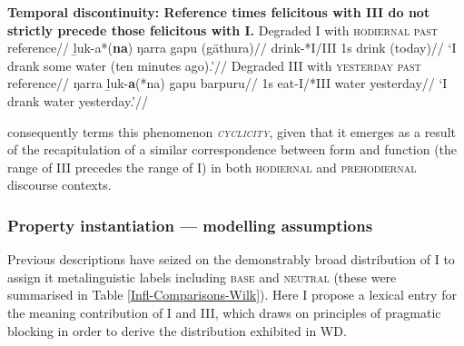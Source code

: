 \pex\textbf{ Temporal discontinuity: Reference times felicitous with \gls{III} do not strictly precede those felicitous with \gls{I}.}
\a\begingl\glpreamble Degraded \gls{I} with \textsc{hodiernal past} reference//
\gla ḻuk-a*(\textbf{na}) ŋarra gapu (gäthura)//
\glb drink-*\gls{I}/\gls{III} 1s drink (today)//
\glft`I drank some water (ten minutes ago).'//\endgl
\a\begingl\glpreamble Degraded \gls{III} with \textsc{yesterday past} reference//
\gla ŋarra ḻuk-\textbf{a}(*na) gapu barpuru//
\glb 1s eat-\gls{I}/*\gls{III} water yesterday//
\glft`I drank water yesterday.'\trailingcitation{[DhG~20190405]}//\endgl
\xe


\citet{Comrie1985} consequently terms this phenomenon \textit{\textsc{cyclicity}}, given that it emerges as a result of the recapitulation of a similar correspondence between form and function (the range of \gls{III} precedes the range of \gls{I}) in both \textsc{hodiernal} and \textsc{prehodiernal} discourse contexts.


\subsubsection{Property instantiation --- modelling assumptions}%

Previous descriptions have seized on the demonstrably broad distribution of \gls{I} to assign it metalinguistic labels including \textsc{base} and \textsc{neutral} (these were summarised in Table \ref{Infl-Comparisons-Wilk}). Here I propose a lexical entry for the meaning contribution of \gls{I} and \gls{III}, which draws on principles of pragmatic blocking in order to derive the distribution exhibited in WD.



